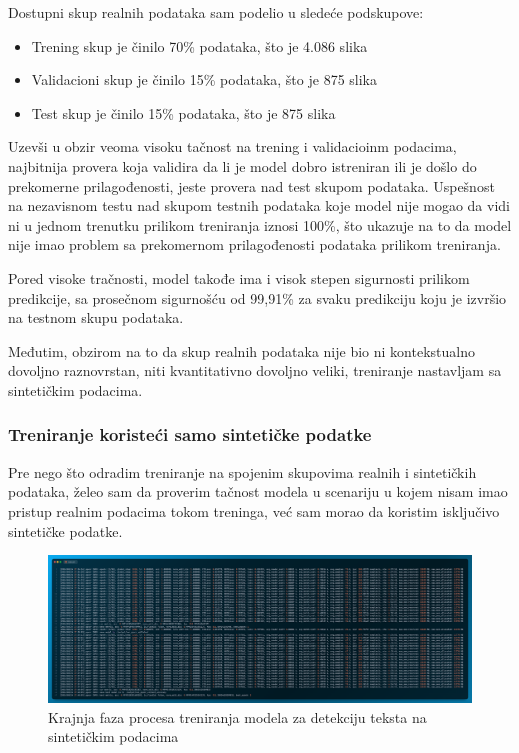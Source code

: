 \documentclass[a4paper,12pt]{article}
\begin{document}
	Dostupni skup realnih podataka sam podelio u sledeće podskupove:
	\begin{itemize}
		\item Trening skup je činilo 70\% podataka, što je 4.086 slika
		\item Validacioni skup je činilo 15\% podataka, što je 875 slika
		\item Test skup je činilo 15\% podataka, što je 875 slika
	\end{itemize}
	
	Uzevši u obzir veoma visoku tačnost na trening i validacioinm podacima, najbitnija provera koja validira da li je model dobro istreniran ili je došlo do prekomerne prilagođenosti, jeste provera nad test skupom podataka. Uspešnost na nezavisnom testu nad skupom testnih podataka koje model nije mogao da vidi ni u jednom trenutku prilikom treniranja iznosi 100\%, što ukazuje na to da model nije imao problem sa prekomernom prilagođenosti podataka prilikom treniranja.
	
	Pored visoke tračnosti, model takođe ima i visok stepen sigurnosti prilikom predikcije, sa prosečnom sigurnošću od 99,91\% za svaku predikciju koju je izvršio na testnom skupu podataka.
	
	Međutim, obzirom na to da skup realnih podataka nije bio ni kontekstualno dovoljno raznovrstan, niti kvantitativno dovoljno veliki, treniranje nastavljam sa sintetičkim podacima.
	
	\subsubsection{Treniranje koristeći samo sintetičke podatke}
	Pre nego što odradim treniranje na spojenim skupovima realnih i sintetičkih podataka, želeo sam da proverim tačnost modela u scenariju u kojem nisam imao pristup realnim podacima tokom treninga, već sam morao da koristim isključivo sintetičke podatke.
	
	\begin{figure}[H]
		\centering
		\includegraphics[width=\textwidth]{assets/train-code-synthetic-data.png}
		\caption{Krajnja faza procesa treniranja modela za detekciju teksta na sintetičkim podacima}
		\label{fig:train-code-synthetic-data}
	\end{figure}
\end{document}
